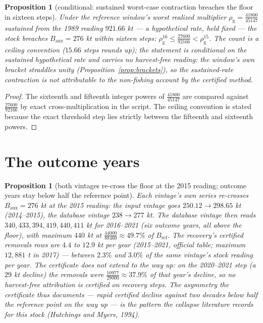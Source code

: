 \documentclass[10pt,twocolumn]{article}
\theoremstyle{plain}
\newtheorem{proposition}[theorem]{Proposition}
\theoremstyle{remark}
\begin{document}
\begin{proposition}[conditional: sustained worst-case contraction
breaches the floor in sixteen steps]\label{prop:sustained}
Under the reference window's worst realized multiplier
\(\rho_{\mathrm{g}} = \tfrac{41800}{45147}\) sustained from the 1989
reading \(921.66\) kt --- a hypothetical rate, held fixed ---
the stock breaches \(B_{\mathrm{aux}} = 276\) kt within sixteen steps:
\(\rho_{\mathrm{g}}^{16} \le \tfrac{27600}{92166} < \rho_{\mathrm{g}}^{15}\).
The count is a ceiling convention (\(15.66\) steps rounds up); the
statement is conditional on the sustained hypothetical rate and
carries no harvest-free reading: the window's own bracket straddles
unity (Proposition~\ref{prop:brackets}), so the sustained-rate
contraction is not attributable to the non-fishing account by the
certified method.
\end{proposition}

\begin{proof}
The sixteenth and fifteenth integer powers of
\(\tfrac{41800}{45147}\) are compared against
\(\tfrac{27600}{92166}\) by exact cross-multiplication in the script.
The ceiling convention is stated because the exact threshold step lies
strictly between the fifteenth and sixteenth powers.
\end{proof}

\section{The outcome years}\label{outcome}

\begin{proposition}[both vintages re-cross the floor at the 2015
reading; outcome years stay below half the reference point]
\label{prop:recovery}
Each vintage's own series re-crosses \(B_{\mathrm{aux}} = 276\) kt at
the 2015 reading: the input vintage goes \(250.12 \to 298.65\) kt
(2014--2015), the database vintage \(238 \to 277\) kt. The database
vintage then reads \(340, 433, 394, 419, 440, 411\) kt for
2016--2021 (six outcome years, all above the floor), with maximum
\(440\) kt at \(\tfrac{44000}{88460} \approx 49.7\%\) of
\(B_{\mathrm{ref}}\). The recovery's certified removals rows are
\(4.4\) to \(12.9\) kt per year (2015--2021, official table; maximum
\(12{,}881\) t in 2017) --- between \(2.3\%\) and \(3.0\%\) of the
same vintage's stock reading per year. The certificate does not
extend to the way up: on the 2020--2021 step (a \(29\) kt decline)
the removals were \(\tfrac{10977}{29000} \approx 37.9\%\) of that
year's decline, so no harvest-free attribution is certified on
recovery steps. The asymmetry the certificate thus documents --- rapid
certified decline against two decades below half the reference point on
the way up --- is the pattern the collapse literature records for this
stock (Hutchings and Myers, 1994).
\end{proposition}
\end{document}
